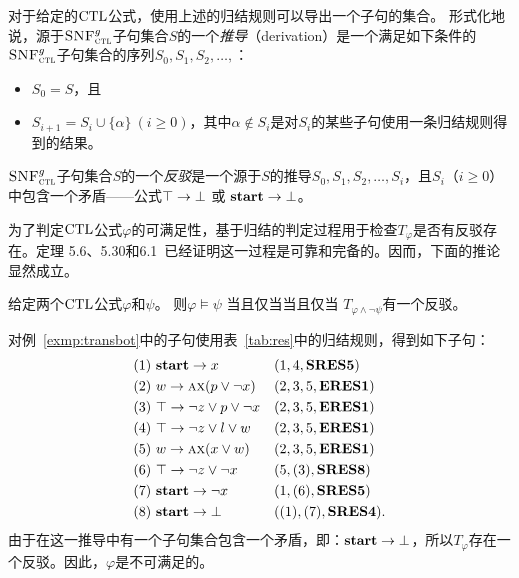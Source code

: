 对于给定的$\textrm{CTL}$公式，使用上述的归结规则可以导出一个子句的集合。
形式化地说，源于${\textsc{SNF}_{\textsc{ctl}}^g}$子句集合$S$的一个\emph{推导}（derivation）是一个满足如下条件的${\textsc{SNF}_{\textsc{ctl}}^g}$子句集合的序列$S_0, S_1, S_2, \ldots, $：
\begin{itemize}
	\item $S_0=S$，且
	\item $S_{i+1} = S_i\cup \{\alpha\}~(i\ge 0)$，其中$\alpha\notin S_i$是对$S_i$的某些子句使用一条归结规则得到的结果。
\end{itemize}

${\textsc{SNF}_{\textsc{ctl}}^g}$子句集合$S$的一个\emph{反驳}是一个源于$S$的推导$S_0, S_1, S_2, \ldots, S_i$，且$S_i$（$i\geq 0$）中包含一个矛盾——公式$\top\rightarrow\bot$ 或 $\textbf{start}\rightarrow\bot$。

为了判定$\textrm{CTL}$公式$\varphi$的可满足性，基于归结的判定过程用于检查$T_{\varphi}$是否有反驳存在。定理 5.6、5.30和6.1~\cite{zhang2014resolution}已经证明这一过程是可靠和完备的。因而，下面的推论显然成立。
\begin{corollary}
	给定两个$\textrm{CTL}$公式$\varphi$和$\psi$。 则$\varphi\models\psi$ 当且仅当当且仅当 $T_{\varphi\land\neg\psi}$有一个反驳。
\end{corollary}

\begin{example}\label{exmp:resbot}
	对例~\ref{exmp:transbot}中的子句使用表~\ref{tab:res}中的归结规则，得到如下子句：
	\begin{align*}
		&(1)\ \textbf{start} \rightarrow x  && (1, 4, \textbf{SRES5})\\
		&(2)\ w \rightarrow \textsc{a}\textsc{x} (p \vee \neg x) && (2, 3,5,\textbf{ERES1})\\
		&(3)\ \top \rightarrow  \neg z \vee p \vee \neg x  && (2, 3,5,\textbf{ERES1})\\
		&(4)\ \top \rightarrow \neg z \vee l \vee w && (2, 3,5,\textbf{ERES1})\\
		&(5)\ w \rightarrow \textsc{a} \textsc{x}(x \vee w) && (2, 3,5,\textbf{ERES1})\\
		&(6)\ \top \rightarrow \neg z \vee \neg x && (5, (3), \textbf{SRES8})\\
		&(7)\ \textbf{start} \rightarrow \neg x && (1, (6), \textbf{SRES5}) \\
		&(8)\ \textbf{start} \rightarrow \bot && ((1), (7), \textbf{SRES4}).
	\end{align*}
	由于在这一推导中有一个子句集合包含一个矛盾，即：$\textbf{start} \rightarrow \bot$，所以$T_{\varphi}$存在一个反驳。因此，$\varphi$是不可满足的。
\end{example}


